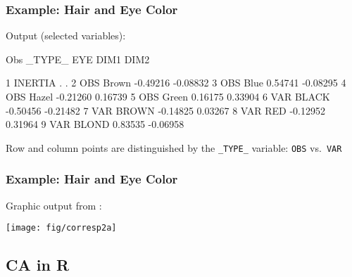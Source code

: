 \begin{frame}[fragile]
  \frametitle{Example: Hair and Eye Color}
Output \Dset (selected variables):
\begin{Output}[fontsize=\footnotesize,baselinestretch=0.8,gobble=3]
     Obs    _TYPE_      EYE       DIM1        DIM2

      1     INERTIA               .           .
      2     OBS        Brown    -0.49216    -0.08832
      3     OBS        Blue      0.54741    -0.08295
      4     OBS        Hazel    -0.21260     0.16739
      5     OBS        Green     0.16175     0.33904
      6     VAR        BLACK    -0.50456    -0.21482
      7     VAR        BROWN    -0.14825     0.03267
      8     VAR        RED      -0.12952     0.31964
      9     VAR        BLOND     0.83535    -0.06958
\end{Output}
Row and column points are distinguished by the \verb|_TYPE_| variable: \texttt{OBS} vs.\ \texttt{VAR}
\end{frame}

\begin{frame}
  \frametitle{Example: Hair and Eye Color}
Graphic output from :
 \begin{center}
  \texttt{[image: fig/corresp2a]}
 \end{center}
\end{frame}

\subsection{CA in R}


